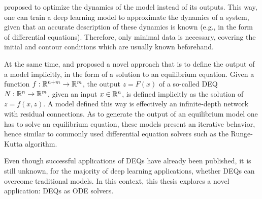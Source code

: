 \textcite{Raissi2019} proposed to optimize the dynamics of the model instead of its outputs.
This way, one can train a deep learning model to approximate the dynamics of a system, given that an accurate description of these dynamics is known (e.g., in the form of differential equations).
Therefore, only minimal data is necessary, covering the initial and contour conditions which are usually known beforehand.

At the same time, \textcite{Bai2019} and \textcite{Ghaoui2019} proposed a novel approach that is to define the output of a model implicitly, in the form of a solution to an equilibrium equation.
Given a function $f:\mathbb{R}^{n+m}\to\mathbb{R}^m$, the output $z = F(x)$ of a so-called \gls{DEQ} $N:\mathbb{R}^n\to \mathbb{R}^m$, given an input $x\in\mathbb{R}^n$, is defined implicitly as the solution of $z = f(x,z)$.
A model defined this way is effectively an infinite-depth network\cite{Bai2019} with residual connections\cite{he_deep_2016}.
As to generate the output of an equilibrium model one has to solve an equilibrium equation, these models present an iterative behavior, hence similar to commonly used differential equation solvers such as the Runge-Kutta algorithm.

Even though successful applications of \gls{DEQ}s have already been published\cite{bai_multiscale_2020}, it is still unknown, for the majority of deep learning applications, whether \gls{DEQ}s can overcome traditional models. In this context, this thesis explores a novel application: \gls{DEQ}s as \gls{ODE} solvers.




